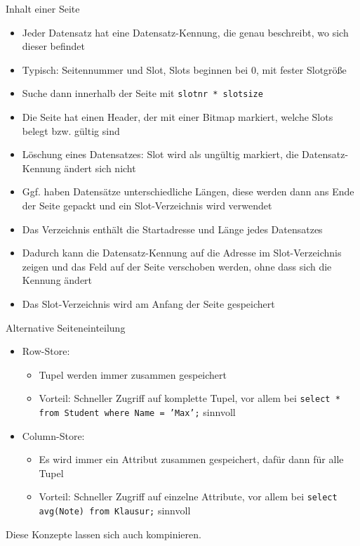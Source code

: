 \documentclass{article}
\begin{document}
\begin{block}{Inhalt einer Seite}
  \begin{itemize}
    \item Jeder Datensatz hat eine Datensatz-Kennung, die genau beschreibt, wo sich dieser befindet
    \item Typisch: Seitennummer und Slot, Slots beginnen bei 0, mit fester Slotgröße
    \item Suche dann innerhalb der Seite mit \texttt{slotnr * slotsize}
    \item Die Seite hat einen Header, der mit einer Bitmap markiert, welche Slots belegt bzw. gültig sind
    \item Löschung eines Datensatzes: Slot wird als ungültig markiert, die Datensatz-Kennung ändert sich nicht
    \item Ggf. haben Datensätze unterschiedliche Längen, diese werden dann ans Ende der Seite gepackt und ein Slot-Verzeichnis wird verwendet
    \item Das Verzeichnis enthält die Startadresse und Länge jedes Datensatzes
    \item Dadurch kann die Datensatz-Kennung auf die Adresse im Slot-Verzeichnis zeigen und das Feld auf der Seite verschoben werden, ohne dass sich die Kennung ändert
    \item Das Slot-Verzeichnis wird am Anfang der Seite gespeichert
  \end{itemize}
\end{block}

\begin{block}{Alternative Seiteneinteilung}
  \begin{itemize}
    \item Row-Store:
    \begin{itemize}
      \item Tupel werden immer zusammen gespeichert
      \item Vorteil: Schneller Zugriff auf komplette Tupel, vor allem bei \texttt{select * from Student where Name = 'Max';} sinnvoll
    \end{itemize}
    \item Column-Store:
    \begin{itemize}
      \item Es wird immer ein Attribut zusammen gespeichert, dafür dann für alle Tupel
      \item Vorteil: Schneller Zugriff auf einzelne Attribute, vor allem bei \texttt{select avg(Note) from Klausur;} sinnvoll
    \end{itemize}
  \end{itemize}
  Diese Konzepte lassen sich auch kompinieren.
\end{block}
\end{document}
